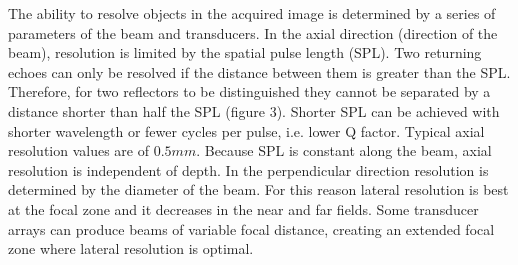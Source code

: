 \documentclass[11pt]{article} %
\begin{document}
	The ability to resolve objects in the acquired image is determined by a series of parameters of the beam and transducers. In the axial direction (direction of the beam), resolution is limited by the spatial pulse length (SPL). Two returning echoes can only be resolved if the distance between them is greater than the SPL. Therefore, for two reflectors to be distinguished they cannot be separated by a distance shorter than half the SPL (figure 3). Shorter SPL can be achieved with shorter wavelength or fewer cycles per pulse, i.e. lower Q factor. Typical axial resolution values are of $0.5 mm$. Because SPL is constant along the beam, axial resolution is independent of depth.
In the perpendicular direction resolution is determined by the diameter of the beam. For this reason lateral resolution is best at the focal zone and it decreases in the near and far fields. Some transducer arrays can produce beams of variable focal distance, creating an extended focal zone where lateral resolution is optimal. 
\end{document}
